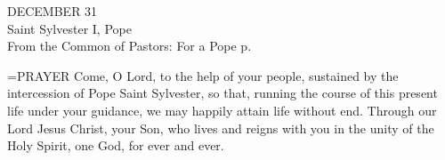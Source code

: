 \begin{center}\normalsize DECEMBER 31\\
\footnotesize Saint Sylvester I, Pope\\
\footnotesize From the Common of Pastors: For a Pope p.\\
\end{center}

\hangindent=\parindent \small{PRAYER 
Come, O Lord, to the help of your people,
sustained by the intercession of Pope Saint Sylvester,
so that, running the course of this present life under your guidance,
we may happily attain life without end.
Through our Lord Jesus Christ, your Son,
who lives and reigns with you in the unity of the Holy Spirit,
one God, for ever and ever.\\}
 
